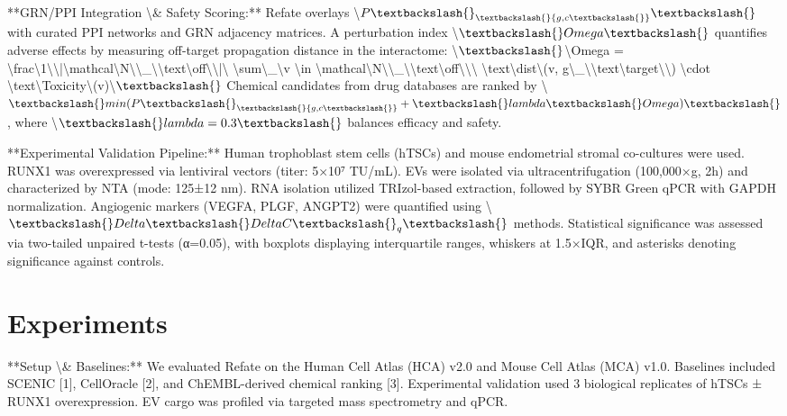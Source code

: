 \documentclass[11pt,a4paper]{article}
\begin{document}
**GRN/PPI Integration \textbackslash{}& Safety Scoring:** Refate overlays \textbackslash{}$P\textbackslash{}_\textbackslash{}{g,c\textbackslash{}}\textbackslash{}$ with curated PPI networks and GRN adjacency matrices. A perturbation index \textbackslash{}$\textbackslash{}Omega\textbackslash{}$ quantifies adverse effects by measuring off-target propagation distance in the interactome:
\textbackslash{}$\textbackslash{}$\textbackslash{}Omega = \textbackslash{}frac\textbackslash{}{1\textbackslash{}}\textbackslash{}{|\textbackslash{}mathcal\textbackslash{}{N\textbackslash{}}\textbackslash{}_\textbackslash{}{\textbackslash{}text\textbackslash{}{off\textbackslash{}}\textbackslash{}}|\textbackslash{}} \textbackslash{}sum\textbackslash{}_\textbackslash{}{v \textbackslash{}in \textbackslash{}mathcal\textbackslash{}{N\textbackslash{}}\textbackslash{}_\textbackslash{}{\textbackslash{}text\textbackslash{}{off\textbackslash{}}\textbackslash{}}\textbackslash{}} \textbackslash{}text\textbackslash{}{dist\textbackslash{}}(v, g\textbackslash{}_\textbackslash{}{\textbackslash{}text\textbackslash{}{target\textbackslash{}}\textbackslash{}}) \textbackslash{}cdot \textbackslash{}text\textbackslash{}{Toxicity\textbackslash{}}(v)\textbackslash{}$\textbackslash{}$
Chemical candidates from drug databases are ranked by \textbackslash{}$\textbackslash{}min(P\textbackslash{}_\textbackslash{}{g,c\textbackslash{}} + \textbackslash{}lambda \textbackslash{}Omega)\textbackslash{}$, where \textbackslash{}$\textbackslash{}lambda=0.3\textbackslash{}$ balances efficacy and safety.

**Experimental Validation Pipeline:** Human trophoblast stem cells (hTSCs) and mouse endometrial stromal co-cultures were used. RUNX1 was overexpressed via lentiviral vectors (titer: 5×10⁷ TU/mL). EVs were isolated via ultracentrifugation (100,000×g, 2h) and characterized by NTA (mode: 125±12 nm). RNA isolation utilized TRIzol-based extraction, followed by SYBR Green qPCR with GAPDH normalization. Angiogenic markers (VEGFA, PLGF, ANGPT2) were quantified using \textbackslash{}$\textbackslash{}Delta\textbackslash{}Delta C\textbackslash{}_q\textbackslash{}$ methods. Statistical significance was assessed via two-tailed unpaired t-tests (α=0.05), with boxplots displaying interquartile ranges, whiskers at 1.5×IQR, and asterisks denoting significance against controls.

\section{Experiments}
**Setup \textbackslash{}& Baselines:** We evaluated Refate on the Human Cell Atlas (HCA) v2.0 and Mouse Cell Atlas (MCA) v1.0. Baselines included SCENIC [1], CellOracle [2], and ChEMBL-derived chemical ranking [3]. Experimental validation used 3 biological replicates of hTSCs ± RUNX1 overexpression. EV cargo was profiled via targeted mass spectrometry and qPCR.
\end{document}
